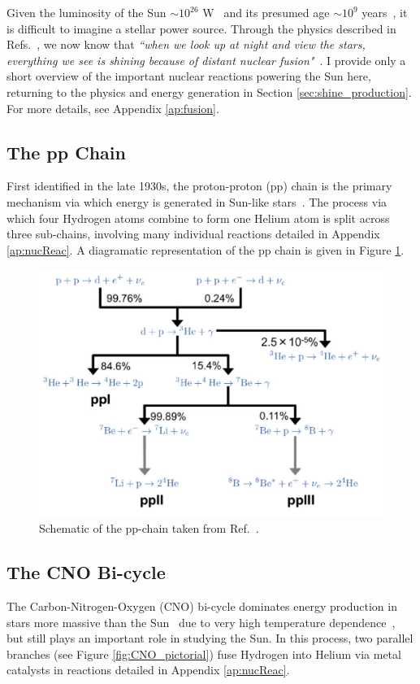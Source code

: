 \documentclass[12pt]{article}
\begin{document}
%
Given the luminosity of the Sun $\sim 10^{26}$ W~\cite{Kopp_2016} and its presumed age $\sim 10^9$ years~\cite{Connelly2012}, it is difficult to imagine a stellar power source. Through the physics described in Refs.~\cite{Gamow1938,Clayton1983,Rolfs1988}, we now know that \textit{``when we look up at night and view the stars, everything we see is shining because of distant nuclear fusion"}~\cite{sagan1985cosmos}. I provide only a short overview of the important nuclear reactions powering the Sun here, returning to the physics and energy generation in Section \ref{sec:shine_production}. For more details, see Appendix \ref{ap:fusion}.

\subsection{The pp Chain}
First identified in the late 1930s, the proton-proton (pp) chain is the primary mechanism via which energy is generated in Sun-like stars~\cite{Bethe1939,Phillips1999}. The process via which four Hydrogen atoms combine to form one Helium atom is split across three sub-chains, involving many individual reactions detailed in Appendix \ref{ap:nucReac}. A diagramatic representation of the pp chain is given in Figure \ref{fig:pp_pictorial}.

\begin{figure}[H]
    \centering
    \includegraphics[width=0.5\linewidth]{Main Graphics/pp_pictorial.png}
    \caption{Schematic of the pp-chain taken from Ref.~\cite{fusionGraphics}.}
    \label{fig:pp_pictorial}
\end{figure}

\subsection{The CNO Bi-cycle}
The Carbon-Nitrogen-Oxygen (CNO) bi-cycle dominates energy production in stars more massive than the Sun~\cite{Phillips1999} due to very high temperature dependence~\cite{Prialnik}, but still plays an important role in studying the Sun. In this process, two parallel branches (see Figure \ref{fig:CNO_pictorial}) fuse Hydrogen into Helium via metal catalysts in reactions detailed in Appendix \ref{ap:nucReac}.
\end{document}

